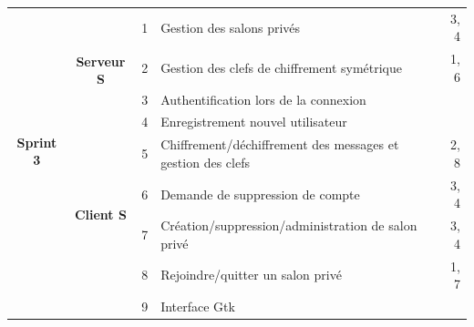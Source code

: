 \documentclass[a4paper,11pt,french]{article}
\begin{document}
\begin{tabular}{|c|c|r|l|r|}
\multirow{8}{*}{\begin{sideways}\textbf{Sprint 3}\end{sideways}}&\multirow{4}{*}{\begin{sideways}\textbf{Serveur S}\end{sideways}}&1& Gestion des salons privés & 3, 4\\
&&2& Gestion des clefs de chiffrement symétrique & 1, 6\\
&&3& Authentification lors de la connexion & \\
&&4& Enregistrement nouvel utilisateur & \\
\cline{2-5}
&\multirow{4}{*}{\begin{sideways}\textbf{Client S}\end{sideways}}& 5 & Chiffrement/déchiffrement des messages et gestion des clefs & 2, 8\\
&& 6 & Demande de suppression de compte & 3, 4\\
&& 7 & Création/suppression/administration de salon privé & 3, 4\\
&& 8 & Rejoindre/quitter un salon privé & 1, 7\\
&& 9 & Interface Gtk &\\
\hline

\end{tabular}
\end{document}
